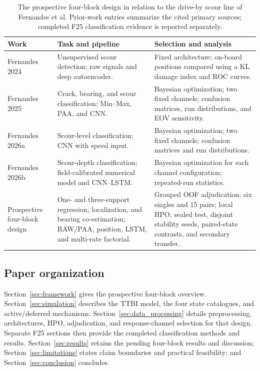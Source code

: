 \begin{table}[htbp]
\centering
\caption{The prospective four-block design in relation to the drive-by scour
line of Fernandes et al. Prior-work entries summarize the cited primary
sources; completed F25 classification evidence is reported separately.}
\label{tab:delta}
\small
\setlength{\tabcolsep}{3pt}
\begin{tabular}{@{}>{\raggedright\arraybackslash}p{}
>{\raggedright\arraybackslash}p{}
>{\raggedright\arraybackslash}p{}@{}}
\toprule
Work & Task and pipeline & Selection and analysis \\
\midrule
Fernandes 2024~\cite{fernandes2024driveby} & Unsupervised scour detection;
raw signals and deep autoencoder. & Fixed architecture; on-board positions
compared using a KL damage index and ROC curves. \\
\addlinespace
Fernandes 2025~\cite{fernandes2025early} & Crack, bearing, and scour
classification; Min--Max, PAA, and CNN. & Bayesian optimization; two fixed
channels; confusion matrices, run distributions, and EOV sensitivity. \\
\addlinespace
Fernandes 2026a~\cite{fernandes2026early} & Scour-level classification;
CNN with speed input. & Bayesian optimization; two fixed channels;
confusion matrices and run distributions. \\
\addlinespace
Fernandes 2026b~\cite{fernandes2026canelas} & Scour-depth classification;
field-calibrated numerical model and CNN--LSTM. & Bayesian optimization for
each channel configuration; repeated-run statistics. \\
\addlinespace
Prospective four-block design & One- and three-support regression,
localization, and bearing co-estimation; RAW/PAA, position, LSTM, and
multi-rate factorial. & Grouped OOF adjudication; six singles and 15 pairs;
local HPO; sealed test, disjoint stability seeds, paired-state contrasts,
and secondary transfer. \\
\bottomrule
\end{tabular}
\end{table}

\subsection{Paper organization}

Section~\ref{sec:framework} gives the prospective four-block overview.
Section~\ref{sec:simulation} describes the TTBI model, the four state
catalogues, and active/deferred mechanisms. Section~\ref{sec:data_processing}
details preprocessing, architectures, HPO, adjudication, and response-channel
selection for that design. Separate F25 sections then provide the completed
classification methods and results. Section~\ref{sec:results} retains the
pending four-block results and discussion;
Section~\ref{sec:limitations} states claim boundaries and practical
feasibility; and Section~\ref{sec:conclusion} concludes.
